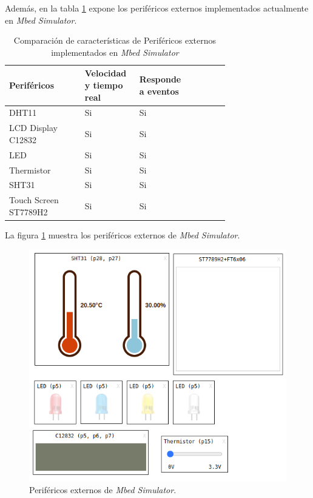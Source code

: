 Además, en la tabla \ref{tab:perifericosExternosMBED} expone los  periféricos externos implementados actualmente en \textit{Mbed Simulator}.


\begin{table}[h]
\centering
\caption[Comparación de características de Periféricos externos implementados en \textit{Mbed Simulator}]{Comparación de características de Periféricos externos implementados en \textit{Mbed Simulator}}
\begin{tabular}{p{0.30\linewidth} p{0.14\linewidth}  p{0.14\linewidth}  p{0.14\linewidth}}
\toprule
\textbf{Periféricos} 
& \textbf{Velocidad y tiempo real}
& \textbf{Responde a eventos}
\\
\midrule
DHT11 & Si & Si  \\
LCD Display C12832 & Si & Si  \\
LED & Si & Si \\
Thermistor & Si & Si \\
SHT31 & Si & Si \\
Touch Screen ST7789H2 & Si & Si \\
\bottomrule
\hline
\end{tabular}
\label{tab:perifericosExternosMBED}
\end{table}

\hfill \break
\hfill \break
\hfill \break
\hfill \break
\hfill \break
\hfill \break
\hfill \break
\hfill \break
\hfill \break
\hfill \break
\hfill \break
\hfill \break
\hfill \break
La figura \ref{fig:perifericosMbed} muestra los periféricos externos de \textit{Mbed Simulator}.


\begin{figure}[ht]
	\centering
	\includegraphics[scale=.81]{./Figures/perifericosMBED.png}
	\caption{Periféricos externos de \textit{Mbed Simulator}.}
	\label{fig:perifericosMbed}
\end{figure}

